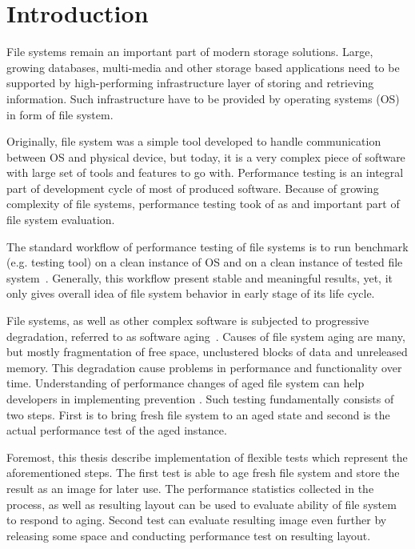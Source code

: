 \documentclass[
  color, %
  table, %
  lof,   %
  lot,   %
]{fithesis3}
\begin{document}
\chapter{Introduction}
File systems remain an important part of modern storage solutions.  Large, growing databases, multi-media and other storage based applications need to be supported by high-performing infrastructure layer of storing and retrieving information. Such infrastructure have to be provided by operating systems (OS) in form of file system.

Originally, file system was a simple tool developed to handle communication between OS and physical device, but today, it is a very complex piece of software with large set of tools and features to go with. Performance testing is an integral part of development cycle of most of produced software. Because of growing complexity of file systems, performance testing took of as and important part of file system evaluation.

The standard workflow of performance testing of file systems is to run benchmark (e.g. testing tool) on a clean instance of OS and on a clean instance of tested file system~\cite{fsbench-article:qhe}. Generally, this workflow present stable and meaningful results, yet, it only gives overall idea of file system behavior in early stage of its life cycle. 

File systems, as well as other complex software is subjected to progressive degradation, referred to as software aging~\cite{Cotroneo:2010:SAA:1913797.1914413}. Causes of file system aging are many, but mostly fragmentation of free space, unclustered blocks of data and unreleased memory. This degradation cause problems in performance and functionality over time. Understanding of performance changes of aged file system can help developers in implementing prevention . Such testing fundamentally consists of two steps. First is to bring fresh file system to an aged state and second is the actual performance test of the aged instance.

Foremost, this thesis describe implementation of flexible tests which represent the aforementioned steps. The first test is able to age fresh file system and store the result as an image for later use. The performance statistics collected in the process, as well as resulting layout can be used to evaluate ability of file system to respond to aging. Second test can evaluate resulting image even further by releasing some space and conducting performance test on resulting layout.
\end{document}
